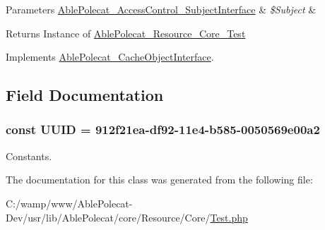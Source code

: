 \begin{DoxyParams}[1]{Parameters}
\hyperlink{interface_able_polecat___access_control___subject_interface}{Able\+Polecat\+\_\+\+Access\+Control\+\_\+\+Subject\+Interface} & {\em \$\+Subject} & \\
\hline
\end{DoxyParams}
\begin{DoxyReturn}{Returns}
Instance of \hyperlink{class_able_polecat___resource___core___test}{Able\+Polecat\+\_\+\+Resource\+\_\+\+Core\+\_\+\+Test} 
\end{DoxyReturn}


Implements \hyperlink{interface_able_polecat___cache_object_interface_a3f2135f6ad45f51d075657f6d20db2cd}{Able\+Polecat\+\_\+\+Cache\+Object\+Interface}.



\subsection{Field Documentation}
\hypertarget{class_able_polecat___resource___core___test_a74b892c8c0b86bf9d04c5819898c51e7}{}
\subsubsection[{U\+U\+I\+D}]{\setlength{\rightskip}{0pt plus 5cm}const U\+U\+I\+D = \textquotesingle{}912f21ea-\/df92-\/11e4-\/b585-\/0050569e00a2\textquotesingle{}}\label{class_able_polecat___resource___core___test_a74b892c8c0b86bf9d04c5819898c51e7}
Constants. 

The documentation for this class was generated from the following file\+:\begin{DoxyCompactItemize}
\item 
C\+:/wamp/www/\+Able\+Polecat-\/\+Dev/usr/lib/\+Able\+Polecat/core/\+Resource/\+Core/\hyperlink{_resource_2_core_2_test_8php}{Test.\+php}\end{DoxyCompactItemize}
